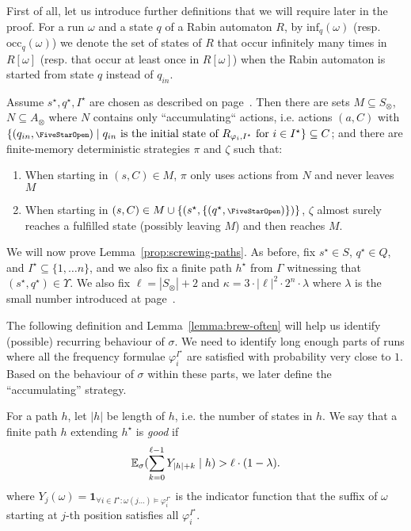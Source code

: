 \documentclass[a4paper,UKenglish]{lipics}
\newcommand{\symbopen}{\text{\scriptsize\FiveStarOpen}}
\newcommand{\idf}{\mathbf{1}}
\newcommand{\Ex}[3][]{\ifblank{#1}{\mathbb{E}_{#2}}{\mathbb{E}^{#1}_{#2}}(#3)}
\newcommand{\rabin}{R}
\newcommand{\rinit}{q_{in}}
\newcommand{\fix}[1]{{#1^\star}}
\newcommand{\fixs}{\fix{s}}
\newcommand{\fixq}{\fix{q}}
\newcommand{\fixI}{\fix{I}}
\newcommand{\fixh}{\fix{h}}
\newcommand{\occu}{\mathrm{occ}}
\newcommand{\infi}{\mathrm{inf}}
\newcommand{\theoremlike}[2]{\par\medskip\penalty-250\refstepcounter{theorem}{{\bfseries\noindent#2
			\ref{#1}.}}}
\newcommand{\thmhelperpre}[2]{\theoremlike{#1}{#2}}
\newcommand{\thmhelperpost}{\par\medskip}
\newenvironment{reflemma}[1]{\thmhelperpre{#1}{Lemma}}{\thmhelperpost}
\begin{document}
First of all, let us introduce further definitions that we will require later in the proof. For a run $\omega$ and a state $q$ of a Rabin automaton $\rabin$, by $\infi_q(\omega)$ (resp. $\occu_q(\omega)$) we denote the set of states of $\rabin$
that occur infinitely many times in $\rabin[\omega]$ (resp. that occur at least once in $\rabin[\omega]$)
when the Rabin automaton is started from state $q$ instead of $\rinit$.


\begin{reflemma}{prop:screwing-paths}
Assume $\fixs, \fixq, \fixI$ are chosen as described on page~\pageref{page:sqI}.	
	Then there are sets $M \subseteq S_\otimes$, $N\subseteq A_\otimes$ where 
	$N$ contains only ``accumulating`` actions, i.e. actions $(a,C)$ with $\{(q_{in}, \symbopen) \mid q_{in} \text{ is the initial state of $\rabin_{\varphi_i,\fixI}$ for } i \in \fixI\} \subseteq C$;
	and there are finite-memory deterministic strategies $\pi$ and $\zeta$ such that:
	\begin{enumerate} 
		\item\label{item:screwing-a}
		When starting in $(s,C) \in M$, $\pi$ only uses actions from $N$ and never leaves $M$
		\item\label{item:screwing-c} When starting in $(s,C) \in M\cup\{(\fixs,\{(\fixq,\symbopen)\})\}$,  $\zeta$ almost surely reaches a fulfilled state (possibly leaving $M$) and then reaches $M$.
	\end{enumerate}
\end{reflemma}

We will now prove Lemma~\ref{prop:screwing-paths}. As before, fix $\fixs\in S$, $\fixq\in Q$, and $\fixI\subseteq\{1,\ldots n\}$, and we also fix a finite path $\fixh$ from $\Gamma$ witnessing that $(\fixs,\fixq)\in \Upsilon$.
We also fix \label{page:ell}$\ell = |S_\otimes| + 2$ and $\kappa = 3 \cdot |\ell|^2 \cdot 2^n \cdot \lambda$ where $\lambda$ is the small number introduced at page~\pageref{page:lambda}.

The following definition and Lemma~\ref{lemma:brew-often} will help us identify (possible) recurring behaviour of $\sigma$. We need to identify long enough parts of runs where all the frequency formulae $\varphi_{i}^{\fixI}$ are satisfied with probability very close to $1$. Based on the behaviour of $\sigma$ within these parts, we later define the ``accumulating'' strategy.

For a path $h$, let $|h|$ be length of $h$, i.e. the number of states in $h$.
We say that a finite path $h$ extending $\fixh$ is {\em good} 
if 
\[
\Ex{\sigma}{\sum_{k=0}^{\ell-1} Y_{|h|+k} \mid h} > \ell\cdot(1-\lambda).
\]
where $Y_j(\omega) = \idf_{\forall i\in\fixI: \omega(j\ldots) \models \varphi_{i}^{\fixI}}$ is the indicator function that the suffix of $\omega$ starting at $j$-th position satisfies all $\varphi_{i}^{\fixI}$.
\end{document}
